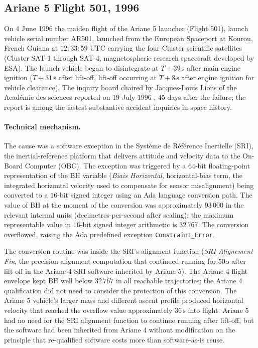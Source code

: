 \subsection{Ariane 5 Flight 501, 1996}

On 4 June 1996 the maiden flight of the Ariane 5 launcher
(Flight 501), launch vehicle serial number AR501, launched from
the European Spaceport at Kourou, French Guiana at $12{:}33{:}59$
UTC carrying the four Cluster scientific satellites (Cluster
SAT-1 through SAT-4, magnetospheric research spacecraft developed
by ESA). The launch vehicle began to disintegrate at $T+39\,\si{
\second}$ after main engine ignition ($T+31\,\si{\second}$ after
lift-off, lift-off occurring at $T+8\,\si{\second}$ after engine
ignition for vehicle clearance). The inquiry board chaired by
Jacques-Louis Lions of the Acad\'emie des sciences reported on
$19$ July $1996$ \cite{acc:ariane501-ifr}, $45$ days after the
failure; the report is among the fastest substantive accident
inquiries in space history.

\paragraph{Technical mechanism.} The cause was a software
exception in the Syst\`eme de R\'ef\'erence Inertielle (SRI), the
inertial-reference platform that delivers attitude and velocity
data to the On-Board Computer (OBC). The exception was triggered
by a $64$-bit floating-point representation of the BH variable
(\textit{Biais Horizontal}, horizontal-bias term, the integrated
horizontal velocity used to compensate for sensor misalignment)
being converted to a $16$-bit signed integer using an Ada
language conversion path. The value of BH at the moment of the
conversion was approximately $93\,000$ in the relevant internal
units (decimetres-per-second after scaling); the maximum
representable value in $16$-bit signed integer arithmetic is
$32\,767$. The conversion overflowed, raising the Ada predefined
exception \texttt{Constraint\_Error}.

The conversion routine was inside the SRI's alignment function
(\textit{SRI Alignement Fin}, the precision-alignment computation
that continued running for $50\,\si{\second}$ after lift-off in
the Ariane 4 SRI software inherited by Ariane 5). The Ariane 4
flight envelope kept BH well below $32\,767$ in all reachable
trajectories; the Ariane 4 qualification did not need to consider
the protection of this conversion. The Ariane 5 vehicle's larger
mass and different ascent profile produced horizontal velocity
that reached the overflow value approximately $36\,\si{\second}$
into flight. Ariane 5 had no need for the SRI alignment function
to continue running after lift-off, but the software had been
inherited from Ariane 4 without modification on the principle
that re-qualified software costs more than software-as-is reuse.

